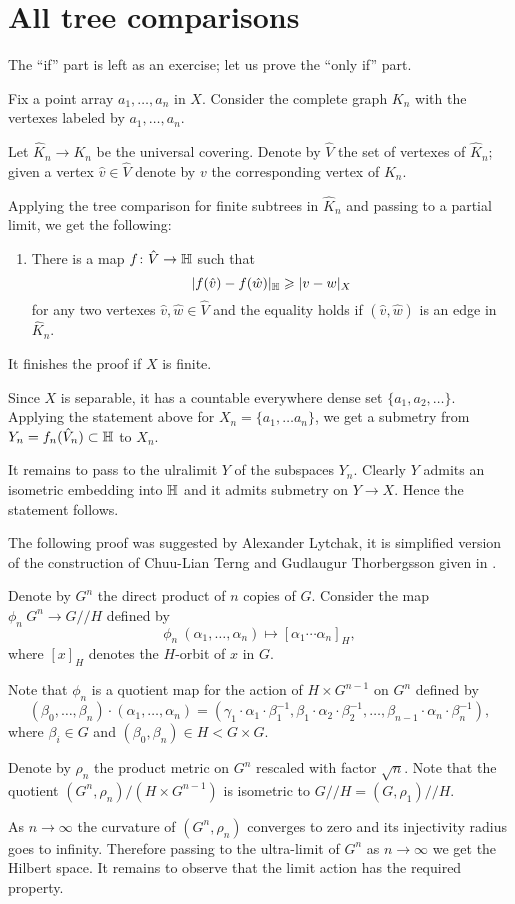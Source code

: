\section{All tree comparisons}\label{sec:all-tree}


The ``if'' part is left as an exercise;
let us prove the ``only if'' part.

Fix a point array $a_1,\dots, a_n$ in $X$.
Consider the complete graph $K_n$ with the vertexes labeled by $a_1,\dots, a_n$.


Let $\hat K_n\to K_n$ be the universal covering.
Denote by $\hat  V$ the set of vertexes of $\hat  K_n$;
given a vertex $\hat  v\in\hat V$ denote by $v$ the corresponding vertex of $K_n$.

Applying the tree comparison for finite subtrees in $\hat  K_n$ and passing to a partial limit,  we get the following:

\begin{enumerate}[$({*})$]
\item There is a map $f\colon\hat V\to\mathbb{H}$ such that 
\[|f(\hat v)-f(\hat w)|_{\mathbb{H}}\geqslant |v-w|_X\]
for any two vertexes $\hat v,\hat w\in \hat  V$ and the equality holds if $(\hat v,\hat w)$ is an edge in $\hat  K_n$.
\end{enumerate}

It finishes the proof if $X$ is finite.

Since $X$ is separable, it has a countable everywhere dense set $\{a_1,a_2,\dots\}$. 
Applying the statement above for $X_n=\{a_1,\dots a_n\}$, we get 
a submetry from $Y_n=f_n(\hat V_n)\subset \mathbb{H}$ to $X_n$.

It remains to pass to the ulralimit $Y$ of the subspaces $Y_n$.
Clearly $Y$ admits an isometric embedding into $\mathbb{H}$ 
and it admits submetry on $Y\to X$.
Hence the statement follows.
\qeds


The following proof was suggested by Alexander Lytchak, it is simplified version of the construction of Chuu-Lian Terng and Gudlaugur Thorbergsson given in \cite[Section 4]{terng-thorbergsson}.


Denote by $G^n$ the direct product of $n$ copies of $G$.
Consider the map $\phi_n\:G^n\to G/\!\!/H$ defined by
\[\phi_n\:(\alpha_1,\dots,\alpha_n)\mapsto [\alpha_1\cdots\alpha_n]_H,\]
where $[x]_H$ denotes the $H$-orbit of $x$ in $G$.

Note that $\phi_n$ is a quotient map for the action of $H\times G^{n-1}$ on $G^n$ defined by
\[(\beta_0,\dots,\beta_n)\cdot(\alpha_1,\dots,\alpha_n)=(\gamma_1\cdot \alpha_1\cdot\beta_1^{-1},\beta_1\cdot\alpha_2\cdot\beta_2^{-1},\dots,\beta_{n-1}\cdot\alpha_n\cdot\beta_n^{-1}),\]
where $\beta_i\in G$ and $(\beta_0,\beta_n)\in H<G\times G$. 

Denote by $\rho_n$ the product metric on $G^n$ rescaled with factor $\sqrt{n}$.
Note that the quotient $(G^n,\rho_n)/(H\times G^{n-1})$ is isometric to $G/\!\!/H=(G,\rho_1)/\!\!/H$.

As $n\to\infty$ the curvature of $(G^n,\rho_n)$ converges to zero and its injectivity radius goes to infinity.
Therefore passing to the ultra-limit of $G^n$ as $n\to\infty$ we get the Hilbert space.
It remains to observe that the limit action has the required property.
\qeds